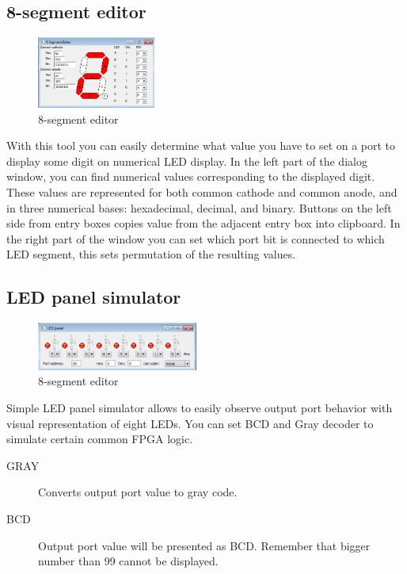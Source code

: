     \clearpage
    \subsection{8-segment editor}
        \begin{figure}
            \centering
            \includegraphics[width=110pt]{img/8segment.png}
            \caption{8-segment editor}
        \end{figure}
        With this tool you can easily determine what value you have to set on a port to display some digit on numerical LED display. In the left part of the dialog window, you can find numerical values corresponding to the displayed digit. These values are represented for both common cathode and common anode, and in three numerical bases: hexadecimal, decimal, and binary. Buttons on the left side from entry boxes copies value from the adjacent entry box into clipboard. In the right part of the window you can set which port bit is connected to which LED segment, this sets permutation of the resulting values.

    \subsection{LED panel simulator}
        \begin{figure}
            \centering
            \includegraphics[width=150pt]{img/Led_panel.png}
            \caption{8-segment editor}
        \end{figure}

        Simple LED panel simulator allows to easily observe output port behavior with visual representation of eight LEDs. You can set BCD and Gray decoder to simulate certain common FPGA logic.

        \begin{description}
            \item[GRAY] Converts output port value to gray code.
            \item[BCD] Output port value will be presented as BCD. Remember that bigger number than 99 cannot be displayed.
        \end{description}

